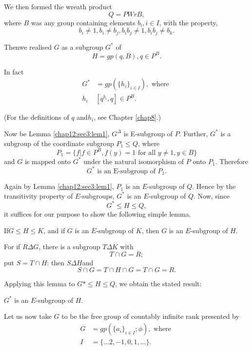We then formed the wreath product 
$$
Q = PWr B,
$$
where $B$ was any group containing elements $b_i, i \in  I$,
with the property, 
$$
b_i \neq 1, b_i \neq b_j,  b_i b_j \neq 1, b_i b_j \neq b_k.
$$

Then\pageoriginale we realised $G$ as a subgroup $G^*$ of 
$$
H = gp(q,B),  q \in  P^B.
$$

In fact 
\begin{align*}
  G^* & = gp(\big\{ h_i \big \}_{i \in  I}), \text{ where }\\
  h_i & [q^{b_i}, q ] \in  P^B.
\end{align*}

(For the definitions of $q$ and$h_i$, see Chapter \ref{chap8}.)

Now be Lemma \ref{chap12:sec3:lem1}, $G^{\Delta}$ is E-subgroup of $P$. Further, $G^*$ is
a subgroup of the coordinate subgroup $P_1 \leq Q$, where  
$$
P_1 = \Bigg\{f \Bigg| f \in  P^B, f(y) = 1 \text{ for all } y
\neq 1, y \in  B \Bigg\} 
$$
and $G$ is mapped onto $G^*$ under the natural isomorphism of $P$ onto
$P_1$. Therefore 
$$
G^* \text{ is an E-subgroup of } P_1.
$$

Again by Lemma \ref{chap12:sec3:lem1}, $P_1$ is an $E$-subgroup of $Q$. Hence by the
transitivity property of $E$-subgroups, $G^*$ is an $E$-subgroup of
$Q$. Now, since  
$$
G^* \leq H \leq Q,
$$
it suffices for our purpose to show the following simple lemma.

\begin{Lemma}\label{chap12:sec3:lem2}%
  If\pageoriginale $G \leq H \leq K$, and if $G$ is an $E$-subgroup of
  $K$, then $G$ is an $E$-subgroup of $H$. 
\end{Lemma}

For if $R \Delta G$, there is a subgroup $T \Delta K$ with 
$$
T \cap G =R;
$$
put $S = T \cap H$: then $S \Delta H$and 
$$
S \cap G = T \cap H \cap G = T \cap G = R.
$$

Applying this lemma to $G* \leq H \leq Q$, we obtain the stated result:
\begin{corollary}
  $G^*$ is an $E$-subgroup of $H$.
\end{corollary} 
 
 Let us now take $G$ to be the free group of countably infinite rank
 presented by  
 \begin{align*}
   G& = gp( \big\{ a_i \big\}_{i \in  I}; \phi), \text{ where }\\
   I & = \big\{ \ldots 2,-1,0,1, \ldots \big \}.
 \end{align*}
 
